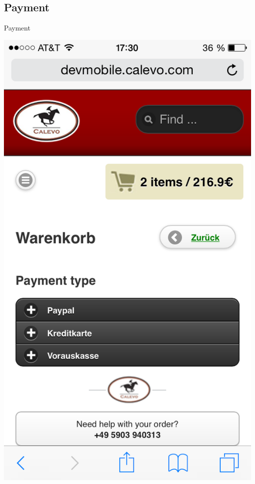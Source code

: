 \subsection{Payment}
\begin{frame}[plain]{Payment}
\begin{center}
  \includegraphics[width=\textwidth,height=1\textheight,keepaspectratio]{pics/payment.png}
\end{center}
\end{frame}

